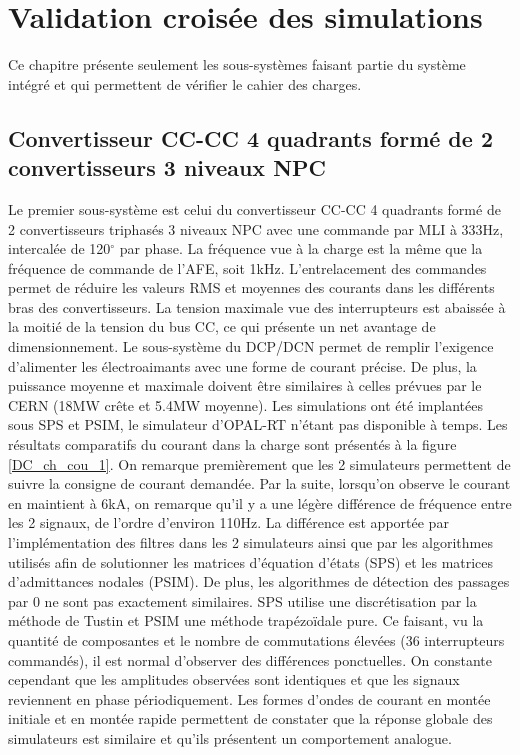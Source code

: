 \chapter{Validation croisée des simulations}
Ce chapitre présente seulement les sous-systèmes faisant partie du système intégré et qui permettent de vérifier le cahier des charges.

\section{Convertisseur CC-CC 4 quadrants formé de 2 convertisseurs 3 niveaux NPC}

Le premier sous-système est celui du convertisseur CC-CC 4 quadrants formé de 2 convertisseurs triphasés 3 niveaux NPC avec une commande par MLI à 333Hz, intercalée de 120$^\circ$ par phase. La fréquence vue à la charge est la même que la fréquence de commande de l'AFE, soit 1kHz. L'entrelacement  des commandes permet de réduire les valeurs RMS et moyennes des courants dans les différents bras des convertisseurs. La tension maximale vue des interrupteurs est abaissée à la moitié de la tension du bus CC, ce qui présente un net avantage de dimensionnement. Le sous-système du DCP/DCN permet de remplir l'exigence d'alimenter les électroaimants avec une forme de courant précise. De plus, la puissance moyenne et maximale doivent être similaires à celles prévues par le CERN (18MW crête et 5.4MW moyenne). Les simulations ont été implantées sous SPS et PSIM, le simulateur d'OPAL-RT n'étant pas disponible à temps. Les résultats comparatifs du courant dans la charge sont présentés à la figure \ref{DC_ch_cou_1}. On remarque premièrement que les 2 simulateurs permettent de suivre la consigne de courant demandée. Par la suite, lorsqu'on observe le courant en maintient à 6kA, on remarque qu'il y a une légère différence de fréquence entre les 2 signaux, de l'ordre d'environ 110Hz. La différence est apportée par l'implémentation des filtres dans les 2 simulateurs ainsi que par les algorithmes utilisés afin de solutionner les matrices d'équation d'états (SPS) et les matrices d'admittances nodales (PSIM). De plus, les algorithmes de détection des passages par 0 ne sont pas exactement similaires. SPS utilise une discrétisation par la méthode de Tustin et PSIM une méthode trapézoïdale pure. Ce faisant, vu la quantité de composantes et le nombre de commutations élevées (36 interrupteurs commandés), il est normal d'observer des différences ponctuelles. On constante cependant que les amplitudes observées sont identiques et que les signaux reviennent en phase périodiquement. Les formes d'ondes de courant en montée initiale et en montée rapide permettent de constater que la réponse globale des simulateurs est similaire et qu'ils présentent un comportement analogue.


